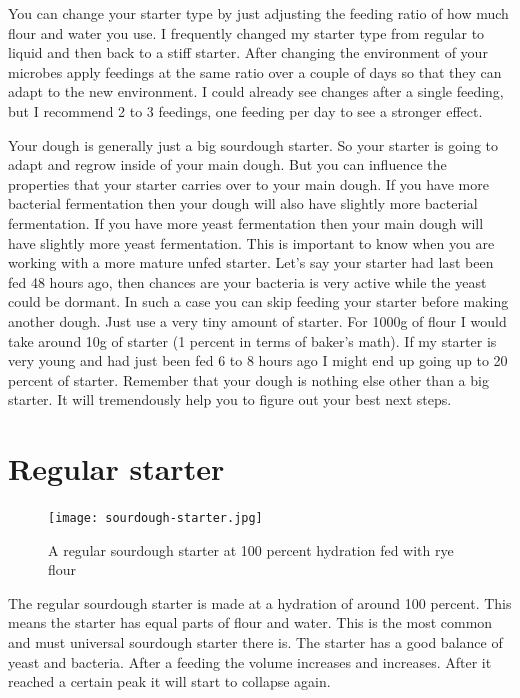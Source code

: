You can change your starter type by just adjusting the feeding ratio of how
much flour and water you use. I frequently changed my starter type from
regular to liquid and then back to a stiff starter. After changing the
environment of your microbes apply feedings at the same ratio over a couple of
days so that they can adapt to the new environment. I could already see
changes after a single feeding, but I recommend 2 to 3 feedings, one feeding per
day to see a stronger effect.

Your dough is generally just a big sourdough starter. So your starter is going
to adapt and regrow inside of your main dough. But you can influence the
properties that your starter carries over to your main dough. If you have more
bacterial fermentation then your dough will also have slightly more bacterial
fermentation. If you have more yeast fermentation then your main dough will
have slightly more yeast fermentation. This is important to know when you are
working with a more mature unfed starter. Let's say your starter had last been
fed 48 hours ago, then chances are your bacteria is very active while the
yeast could be dormant. In such a case you can skip feeding your starter
before making another dough. Just use a very tiny amount of starter. For 1000g
of flour I would take around 10g of starter (1 percent in terms of baker's
math). If my starter is very young and had just been fed 6 to 8 hours ago I might
end up going up to 20 percent of starter. Remember that your dough is nothing
else other than a big starter. It will tremendously help you to figure out
your best next steps.

\section{Regular starter}

\begin{figure}[!htb]
  \texttt{[image: sourdough-starter.jpg]}
  \caption{A regular sourdough starter at 100 percent hydration fed with rye flour}
  \label{fig:regular-sourdough-starter}
\end{figure}

The regular sourdough starter is made at a hydration of around 100 percent.
This means the starter has equal parts of flour and water. This is the most
common and must universal sourdough starter there is. The starter has a good
balance of yeast and bacteria. After a feeding the volume increases and
increases. After it reached a certain peak it will start to collapse again.


